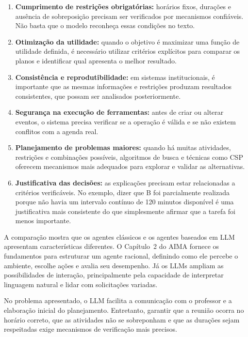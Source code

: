 \documentclass[12pt, a4paper]{article}
\begin{document}
\begin{enumerate}[leftmargin=2em]
  \item \textbf{Cumprimento de restrições obrigatórias:} horários fixos, durações e ausência de sobreposição precisam ser verificados por mecanismos confiáveis. Não basta que o modelo reconheça essas condições no texto.
  \item \textbf{Otimização da utilidade:} quando o objetivo é maximizar uma função de utilidade definida, é necessário utilizar critérios explícitos para comparar os planos e identificar qual apresenta o melhor resultado.
  \item \textbf{Consistência e reprodutibilidade:} em sistemas institucionais, é importante que as mesmas informações e restrições produzam resultados consistentes, que possam ser analisados posteriormente.
  \item \textbf{Segurança na execução de ferramentas:} antes de criar ou alterar eventos, o sistema precisa verificar se a operação é válida e se não existem conflitos com a agenda real.
  \item \textbf{Planejamento de problemas maiores:} quando há muitas atividades, restrições e combinações possíveis, algoritmos de busca e técnicas como CSP oferecem mecanismos mais adequados para explorar e validar as alternativas.
  \item \textbf{Justificativa das decisões:} as explicações precisam estar relacionadas a critérios verificáveis. No exemplo, dizer que B foi parcialmente realizada porque não havia um intervalo contínuo de 120 minutos disponível é uma justificativa mais consistente do que simplesmente afirmar que a tarefa foi menos importante.
\end{enumerate}

A comparação mostra que os agentes clássicos e os agentes baseados em LLM apresentam características diferentes. O Capítulo~2 do AIMA fornece os fundamentos para estruturar um agente racional, definindo como ele percebe o ambiente, escolhe ações e avalia seu desempenho. Já os LLMs ampliam as possibilidades de interação, principalmente pela capacidade de interpretar linguagem natural e lidar com solicitações variadas.

No problema apresentado, o LLM facilita a comunicação com o professor e a elaboração inicial do planejamento. Entretanto, garantir que a reunião ocorra no horário correto, que as atividades não se sobreponham e que as durações sejam respeitadas exige mecanismos de verificação mais precisos.
\end{document}
